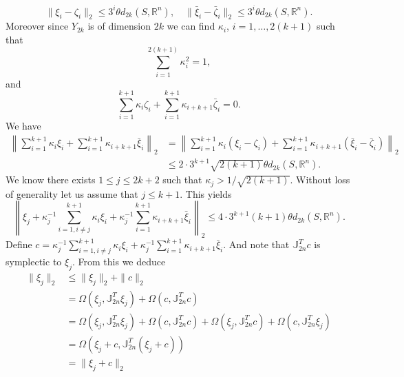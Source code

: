 \begin{equation}
	\| \xi_i - \zeta_i \|_2 \leq 3^i \theta d_{2k}(S,\mathbb R^n),\quad \| \bar{\xi}_i - \bar{\zeta}_i \|_2 \leq 3^i \theta d_{2k}(S,\mathbb R^n).
\end{equation}
Moreover since $Y_{2k}$ is of dimension $2k$ we can find $\kappa_i$, $i=1,\dots,2(k+1)$ such that
\begin{equation} \label{eq:new15}
	\sum_{i=1}^{2(k+1)} \kappa_i^2 = 1,
\end{equation}
and
\begin{equation} \label{eq:new16} 
	\sum_{i=1}^{k+1} \kappa_i \zeta_i + \sum_{i=1}^{k+1} \kappa_{i+k+1} \bar{\zeta}_i = 0.
\end{equation}
We have
\begin{equation} \label{eq:new17}
\begin{aligned}
	\left\| \sum_{i=1}^{k+1} \kappa_i \xi_i + \sum_{i=1}^{k+1} \kappa_{i+k+1} \bar{\xi}_i \right\|_2 &= \left\| \sum_{i=1}^{k+1} \kappa_i (\xi_i - \zeta_i) + \sum_{i=1}^{k+1} \kappa_{i+k+1} (\bar{\xi}_i-\bar{\zeta}_i) \right\|_2 \\
	&\leq 2\cdot 3^{k+1} \sqrt{2(k+1)} \theta d_{2k}(S,\mathbb R^n).
\end{aligned}
\end{equation}
We know there exists $1 \leq j\leq 2k+2$ such that $\kappa_j > 1/\sqrt{2(k+1)}$. Without loss of generality let us assume that $j\leq k+1$. This yields
\begin{equation} \label{eq:new18}
	\left\| \xi_j +  \kappa_j^{-1} \sum_{i=1,i\neq j}^{k+1} \kappa_i \xi_i + \kappa_j^{-1}\sum_{i=1}^{k+1} \kappa_{i+k+1} \bar{\xi}_i \right\|_2 \leq 4\cdot 3^{k+1} (k+1) \theta d_{2k}(S,\mathbb R^n).
\end{equation}
Define $c = \kappa_j^{-1} \sum_{i=1,i\neq j}^{k+1} \kappa_i \xi_i + \kappa_j^{-1}\sum_{i=1}^{k+1} \kappa_{i+k+1} \bar{\xi}_i$. And note that $\mathbb{J}_{2n}^T c$ is symplectic to $\xi_j$. From this we deduce
\begin{equation} \label{eq:new19}
\begin{aligned}
	\| \xi_j \|_2 &\leq \| \xi_j \|_2 + \| c \|_2 \\
		&= \Omega(\xi_j,\mathbb{J}_{2n}^T \xi_j) + \Omega(c,\mathbb{J}_{2n}^T c) \\
	       &= \Omega(\xi_j,\mathbb{J}_{2n}^T \xi_j) + \Omega(c,\mathbb{J}_{2n}^T c) + \Omega(\xi_j,\mathbb{J}_{2n}^T c) + \Omega(c,\mathbb{J}_{2n}^T \xi_j) \\
       	&= \Omega(\xi_j + c, \mathbb{J}^T_{2n} (\xi_j + c)) \\
	&= \| \xi_j + c \|_2	
\end{aligned}
\end{equation}
